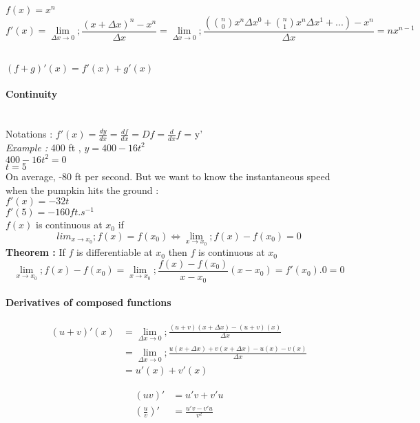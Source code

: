 \documentclass{article}
\begin{document}
    $f(x) = x^n$\\
    \[f'(x) = \lim_{\Delta x \to 0}; \frac{(x + \Delta x)^n - x^n}{\Delta x} = \lim_{\Delta x \to 0}; \frac{(\binom n0 x^n \Delta x ^0 + \binom n1 x^n \Delta x ^1 +... ) - x^n}{\Delta x} = nx^{n-1} \]

    ~\\
    $(f+g)'(x) = f'(x)+g'(x)$


    \paragraph{Continuity}
    ~\\
    Notations : $f'(x) = \frac{dy}{dx} = \frac{df}{dx} = Df = \frac{d}{dx}f$ = y'\\

    \noindent \textit{Example : } 400 ft , $y = 400 - 16t^2$\\
    $400 -16t^2 = 0$\\
    $t = 5$\\
    On average, -80 ft per second. But we want to know the instantaneous speed when the pumpkin hits the ground :\\
    $f'(x) = -32t$\\
    $f'(5) = -160 ft.s^{-1}$\\

    $f(x)$ is continuous at $x_0$ if
    \[ lim_{x \to x_0}; f(x) = f(x_0)  \Leftrightarrow \lim_{x \to x_0}; f(x) - f(x_0) = 0\]
    \textbf{Theorem :}
    If $f$ is differentiable at $x_0$ then $f$ is continuous at $x_0$
    \[\lim_{x \to x_0}; f(x) - f(x_0) = \lim_{x \to x_0};\frac{f(x) - f(x_0)}{x-x_0}(x-x_0) = f'(x_0).0 = 0 \]

    \paragraph{Derivatives of composed functions}

    \begin{align*} (u+v)'(x) &= \lim_{\Delta x \to 0}; \frac{(u+v)(x+\Delta x) - (u +v)(x)}{\Delta x}\\
        &= \lim_{\Delta x \to 0}; \frac{u(x+\Delta x) + v(x+\Delta x) - u(x) - v(x)}{\Delta x}\\
        &= u'(x) + v'(x)
    \end{align*}

    \begin{align*}
        (uv)' &= u'v + v'u\\
        (\frac{u}{v})' &= \frac{u'v - v'u}{v^2}
    \end{align*}
\end{document}

